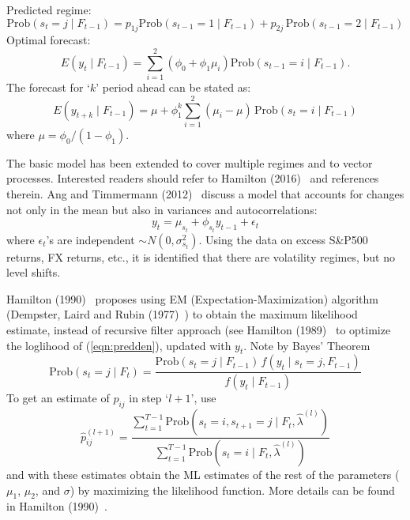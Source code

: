 \noindent Predicted regime: 
	\begin{equation}\label{eqn:predreg}
	\text{Prob}(s_t=j \;|\; F_{t-1})= p_{1j} \text{Prob}(s_{t-1}=1 \;|\; F_{t-1}) + p_{2j} \,\text{Prob}(s_{t-1}=2 \;|\; F_{t-1})
	\end{equation}
\noindent Optimal forecast:
	\begin{equation}\label{eqn:optfore}
	E(y_t \;|\; F_{t-1})= \sum_{i=1}^2 (\phi_0+\phi_1 \mu_i) \text{Prob}(s_{t-1}=i \;|\; F_{t-1}).
	\end{equation}
The forecast for `$k$' period ahead can be stated as:
	\begin{equation}\label{eqn:period}
	E(y_{t+k} \;|\; F_{t-1}) = \mu+\phi_1^k \sum_{i=1}^2 (\mu_i-\mu)\, \text{Prob}(s_t=i \;|\; F_{t-1})
	\end{equation}
where $\mu=\phi_0/(1-\phi_1)$.


The basic model has been extended to cover multiple regimes and to vector processes. Interested readers should refer to Hamilton (2016)~\cite{jdham} and references therein. Ang and Timmermann (2012)~\cite{timmerman} discuss a model that accounts for changes not only in the mean but also in variances and autocorrelations:
	\begin{equation}\label{eqn:varautoy}
	y_t= \mu_{s_t} + \phi_{s_t} y_{t-1} + \epsilon_t
	\end{equation}
where $\epsilon_t$'s are independent $\sim N(0,\sigma_{s_t}^2)$. Using the data on excess S\&P500 returns, FX returns, etc., it is identified that there are volatility regimes, but no level shifts.


Hamilton (1990)~\cite{90ham} proposes using EM (Expectation-Maximization) algorithm (Dempster, Laird and Rubin (1977)~\cite{dempster}) to obtain the maximum likelihood estimate, instead of recursive filter approach (see Hamilton (1989)~\cite{89ham} to optimize the loglihood of (\ref{eqn:predden}), updated with $y_t$. Note by Bayes' Theorem
	\begin{equation}\label{eqn:bayes}
	\text{Prob}(s_t=j \;|\; F_t) = \dfrac{\text{Prob}(s_t=j \;|\; F_{t-1}) \, f(y_t\;|\; s_t=j, F_{t-1})}{f(y_t \;|\; F_{t-1})}
	\end{equation}
To get an estimate of $p_{ij}$ in step `$l+1$', use 
	\begin{equation}\label{eqn:hatpijl}
	\hat{p}_{ij}^{(l+1)}= \dfrac{\sum_{t=1}^{T-1} \text{Prob}(s_t=i, s_{t+1}=j \;|\; F_t, \hat{\lambda}^{(l)})}{\sum_{t=1}^{T-1} \text{Prob}(s_t=i \;|\; F_t, \hat{\lambda}^{(l)})}
	\end{equation}
and with these estimates obtain the ML estimates of the rest of the parameters ($\mu_1$, $\mu_2$, and $\sigma$) by maximizing the likelihood function. More details can be found in Hamilton (1990)~\cite{90ham}.


